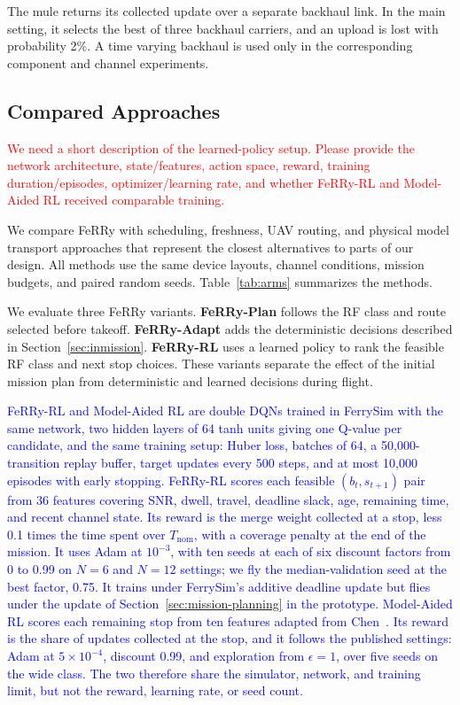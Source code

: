 \documentclass[conference]{IEEEtran}
\newcommand{\sysname}{FeRRy}
\begin{document}
The mule returns its collected update over a separate backhaul link. In the main
setting, it selects the best of three backhaul carriers, and an upload is lost
with probability 2\%. A time varying backhaul is used only in the corresponding
component and channel experiments.

\subsection{Compared Approaches}
\label{sec:baselines}

\textcolor{red}{We need a short description of the learned-policy setup. Please provide the network architecture, state/features, action space, reward, training duration/episodes, optimizer/learning rate, and whether FeRRy-RL and Model-Aided RL received comparable training.}

We compare \sysname{} with scheduling, freshness, UAV routing, and physical
model transport approaches that represent the closest alternatives to parts of
our design. All methods use the same device layouts, channel conditions, mission
budgets, and paired random seeds. Table~\ref{tab:arms} summarizes the methods.

We evaluate three \sysname{} variants. \textbf{\sysname{}-Plan} follows the RF
class and route selected before takeoff. \textbf{\sysname{}-Adapt} adds the
deterministic decisions described in Section~\ref{sec:inmission}.
\textbf{\sysname{}-RL} uses a learned policy to rank the feasible RF class and
next stop choices. These variants separate the effect of the initial mission
plan from deterministic and learned decisions during flight.

\textcolor{blue}{\sysname{}-RL and Model-Aided RL are double DQNs trained in FerrySim with the same
network, two hidden layers of 64 tanh units giving one Q-value per candidate, and
the same training setup: Huber loss, batches of 64, a 50,000-transition replay
buffer, target updates every 500 steps, and at most 10,000 episodes with early
stopping. \sysname{}-RL scores each feasible $(b_t,s_{t+1})$ pair from 36 features
covering SNR, dwell, travel, deadline slack, age, remaining time, and recent
channel state. Its reward is the merge weight collected at a stop, less 0.1 times
the time spent over $T_{\mathrm{nom}}$, with a coverage penalty at the end of the
mission. It uses Adam at $10^{-3}$, with ten seeds at each of six discount factors
from 0 to 0.99 on \(N=6\) and \(N=12\) settings; we fly the median-validation seed
at the best factor, 0.75. It trains under FerrySim's additive deadline update but
flies under the update of Section~\ref{sec:mission-planning} in the prototype.
Model-Aided RL scores each remaining stop from ten features adapted from
Chen~\cite{chen2023model}. Its reward is the share of updates collected at the
stop, and it follows the published settings: Adam at $5\times10^{-4}$, discount
0.99, and exploration from $\epsilon=1$, over five seeds on the wide class. The two
therefore share the simulator, network, and training limit, but not the reward,
learning rate, or seed count.}
\end{document}
